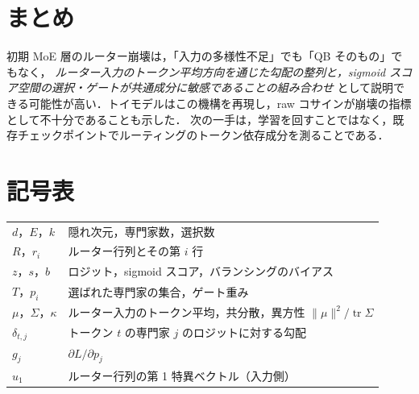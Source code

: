 \documentclass[a4paper,11pt]{ltjsarticle}
\theoremstyle{definition}
\theoremstyle{plain}
\DeclareMathOperator{\tr}{tr}
\newcommand{\norm}[1]{\lVert #1\rVert}
\begin{document}
\section{まとめ}
初期 MoE 層のルーター崩壊は，「入力の多様性不足」でも「QB そのもの」でもなく，
\emph{ルーター入力のトークン平均方向を通じた勾配の整列と，sigmoid スコア空間の選択・ゲートが共通成分に敏感であることの組み合わせ}
として説明できる可能性が高い．トイモデルはこの機構を再現し，raw コサインが崩壊の指標として不十分であることも示した．
次の一手は，学習を回すことではなく，既存チェックポイントでルーティングのトークン依存成分を測ることである．

\appendix
\section{記号表}
\begin{tabular}{@{}ll@{}}
$d$，$E$，$k$ & 隠れ次元，専門家数，選択数 \\
$R$，$r_i$ & ルーター行列とその第 $i$ 行 \\
$z$，$s$，$b$ & ロジット，sigmoid スコア，バランシングのバイアス \\
$T$，$p_i$ & 選ばれた専門家の集合，ゲート重み \\
$\mu$，$\Sigma$，$\kappa$ & ルーター入力のトークン平均，共分散，異方性 $\norm\mu^2/\tr\Sigma$ \\
$\delta_{t,j}$ & トークン $t$ の専門家 $j$ のロジットに対する勾配 \\
$g_j$ & $\partial L/\partial p_j$ \\
$u_1$ & ルーター行列の第 1 特異ベクトル（入力側） \\
\end{tabular}
\end{document}
